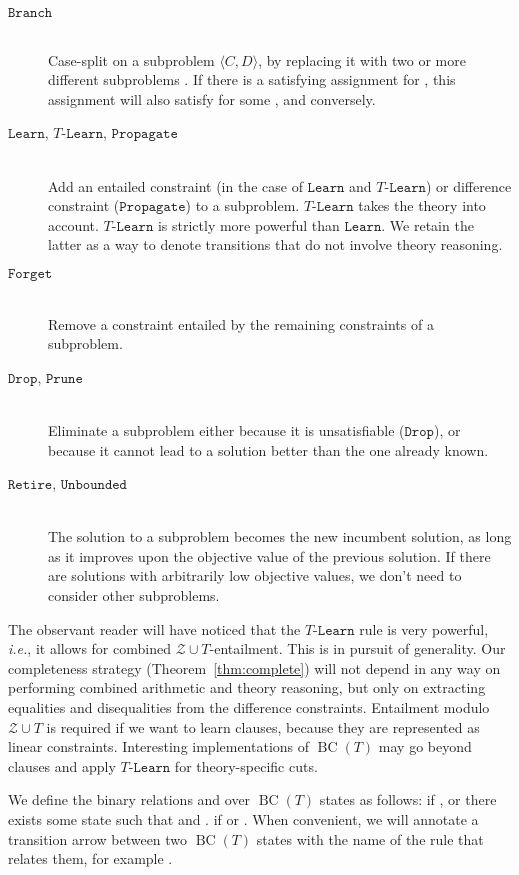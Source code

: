 \documentclass{llncs}
\newcommand{\ie}[0]{\emph{i.e.}, }
\newcommand{\tr}[1]{\ensuremath{\mathtt{#1}}}
\newcommand{\ttr}[1]{\ensuremath{T\text{-}\mathtt{#1}}}
\newcommand{\subp}[2]{\ensuremath{\langle#1, #2\rangle}}
\newcommand{\ZT}[0]{\ensuremath{\mathcal{Z} \cup T}}
\newcommand{\cd}{\subp{C}{D}}
\newcommand{\bct}[0]{\ensuremath{\operatorname{BC}(T)}}
\begin{document}
\begin{description}
\item[\tr{Branch}] \hfill \\
  Case-split on a subproblem \cd{}, by replacing it with two or more
  different subproblems . If there is a satisfying
  assignment for , this assignment will also satisfy  for some , and conversely.
\item[\tr{Learn}, \ttr{Learn}, \tr{Propagate}] \hfill \\
  Add an entailed constraint (in the case of \tr{Learn} and
  \ttr{Learn}) or difference constraint (\tr{Propagate}) to a
  subproblem. \ttr{Learn} takes the theory  into
  account. \ttr{Learn} is strictly more powerful than \tr{Learn}. We
  retain the latter as a way to denote transitions that do not involve
  theory reasoning.
\item[\tr{Forget}] \hfill \\
  Remove a constraint entailed by the remaining constraints of a
  subproblem.
\item[\tr{Drop}, \tr{Prune}] \hfill \\
  Eliminate a subproblem either because it is unsatisfiable
  (\tr{Drop}), or because it cannot lead to a solution better than the
  one already known.
\item[\tr{Retire}, \tr{Unbounded}] \hfill \\
  The solution to a subproblem becomes the new incumbent solution, as
  long as it improves upon the objective value of the previous
  solution. If there are solutions with arbitrarily low objective
  values, we don't need to consider other subproblems.
\end{description}

The observant reader will have noticed that the \ttr{Learn} rule is
very powerful, \ie it allows for combined \ZT{}-entailment. This is in
pursuit of generality. Our completeness strategy
(Theorem~\ref{thm:complete}) will not depend in any way on performing
combined arithmetic and theory reasoning, but only on extracting
equalities and disequalities from the difference
constraints. Entailment modulo \ZT{} is required if we want to learn
clauses, because they are represented as linear
constraints. Interesting implementations of \bct{} may go beyond
clauses and apply \ttr{Learn} for theory-specific cuts.

We define the binary relations  and  over
\bct{} states as follows:  if , or there
exists some state  such that  and .  if  or . When convenient, we
will annotate a transition arrow between two \bct{} states with the
name of the rule that relates them, for example .
\end{document}
